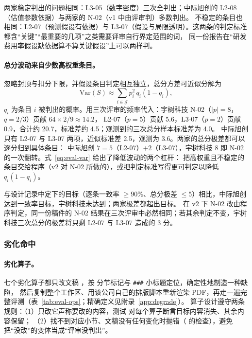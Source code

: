 两家稳定判出的问题相同：L3-05（数字密度）三次全判出；中际旭创的 L2-08（估值参数依据）与两家的 N-02（v1 中由评审判）多数判出。
不稳定的条目也相同：L2-07（预测假设有依据）与 L3-07（假设与局限透明）。这两条的判定标准都含“关键”“最重要的几项”之类需要评审自行界定范围的词，
同一份报告在“研发费用率假设缺依据算不算关键假设”上可以两样判。

\paragraph{总分波动来自少数高权重条目。}
忽略封顶与扣分下限，并假设条目判定相互独立，总分方差可近似分解为
\begin{equation}
\label{eq:eval-var}
\mathrm{Var}(S)\approx\sum_{i\in\mathcal{J}}p_i^2\,q_i(1-q_i),
\end{equation}
$q_i$ 为条目 $i$ 被判出的概率。用三次评审的频率代入：宇树科技 N-02（$|p|=8$，$q=2/3$）贡献 $64\times 2/9\approx 14.2$，
L2-07（$p=5$）贡献 5.6，L3-07（$p=2$）贡献 0.9，合计约 20.7，标准差约 4.5；观测到的三次总分样本标准差为 4.0。
中际旭创只有 L2-07 与 L3-07 两项，近似标准差 2.5，观测为 3.6。两家的总分极差都可以逐分归到具体条目：
中际旭创 $7=5$（L2-07）$+2$（L3-07），宇树科技 $8$ 即 N-02 的一次翻转。式~\eqref{eq:eval-var} 给出了降低波动的两个杠杆：
把高权重且不稳定的条目交给程序（v2 对 N-02 所做的），或把判定标准写得更可判定以降低 $q_i(1-q_i)$。

与设计记录中定下的目标（逐条一致率 $\ge 90\%$、总分极差 $\le 5$）相比，中际旭创达到一致率目标，宇树科技未达到；两家极差都超出目标。
在 v2 下 N-02 改由程序判定，同一份稿件的 N-02 结果在三次评审中必然相同；若其余判定不变，宇树科技三次总分的极差将只剩 L2-07 与 L3-07 造成的 3 分。

\subsubsection{劣化命中}
\label{sec:eval-calib-degrade}

\paragraph{劣化算子。}
七个劣化算子都只改文稿 ，按  分节标记与 \texttt{\#\#\#} 小标题定位，确定性地制造一种缺陷，
然后复制整个工作区、用该公司自己的排版脚本重新渲染 PDF，再走一遍完整评测（表~\ref{tab:eval-ops}；精确定义见附录~\ref{app:degrade}）。
算子设计遵守两条规则：（1）只改它声称要改的内容，测试  对每个算子断言目标内容消失、其余内容保留；
（2）找不到对应小节、文稿没有任何变化时抛错（ 的检查），避免把“没改”的变体当成“评审没判出”。

